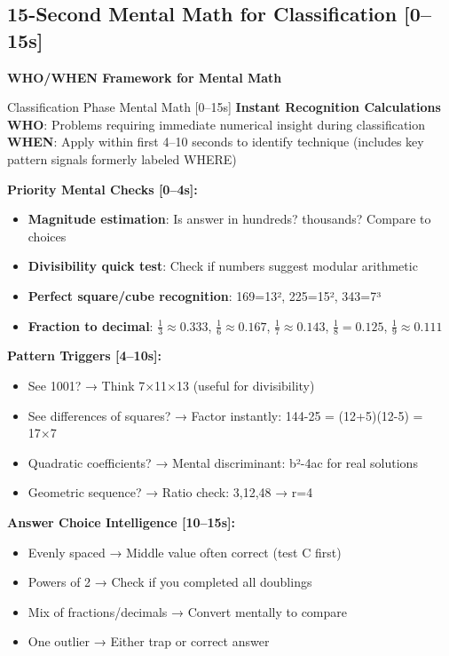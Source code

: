 \documentclass{article}
\begin{document}
\subsection{15-Second Mental Math for Classification [0--15s]}
{\footnotesize\textcolor{timegreen}{}}\quad\textbf{WHO/WHEN Framework for Mental Math}

\begin{mentalbox}{Classification Phase Mental Math [0--15s]}
{\footnotesize\textcolor{timegreen}{}}\quad\textbf{Instant Recognition Calculations}\\
\textbf{WHO}: Problems requiring immediate numerical insight during classification
\textbf{WHEN}: Apply within first 4--10 seconds to identify technique (includes key pattern signals formerly labeled WHERE)

\textbf{Priority Mental Checks [0--4s]:}
\begin{itemize}[nosep]
\item \textbf{Magnitude estimation}: Is answer in hundreds? thousands? Compare to choices
\item \textbf{Divisibility quick test}: Check if numbers suggest modular arithmetic
\item \textbf{Perfect square/cube recognition}: 169=13², 225=15², 343=7³
\item \textbf{Fraction to decimal}: $\frac{1}{3} \approx 0.333$, $\frac{1}{6} \approx 0.167$, $\frac{1}{7} \approx 0.143$, $\frac{1}{8} = 0.125$, $\frac{1}{9} \approx 0.111$
\end{itemize}

\textbf{Pattern Triggers [4--10s]:}
\begin{itemize}[nosep]
\item See 1001? → Think 7×11×13 (useful for divisibility)
\item See differences of squares? → Factor instantly: 144-25 = (12+5)(12-5) = 17×7
\item Quadratic coefficients? → Mental discriminant: b²-4ac for real solutions
\item Geometric sequence? → Ratio check: 3,12,48 → r=4
\end{itemize}

\textbf{Answer Choice Intelligence [10--15s]:}
\begin{itemize}[nosep]
\item Evenly spaced → Middle value often correct (test C first)
\item Powers of 2 → Check if you completed all doublings
\item Mix of fractions/decimals → Convert mentally to compare
\item One outlier → Either trap or correct answer
\end{itemize}
\end{mentalbox}
\end{document}
